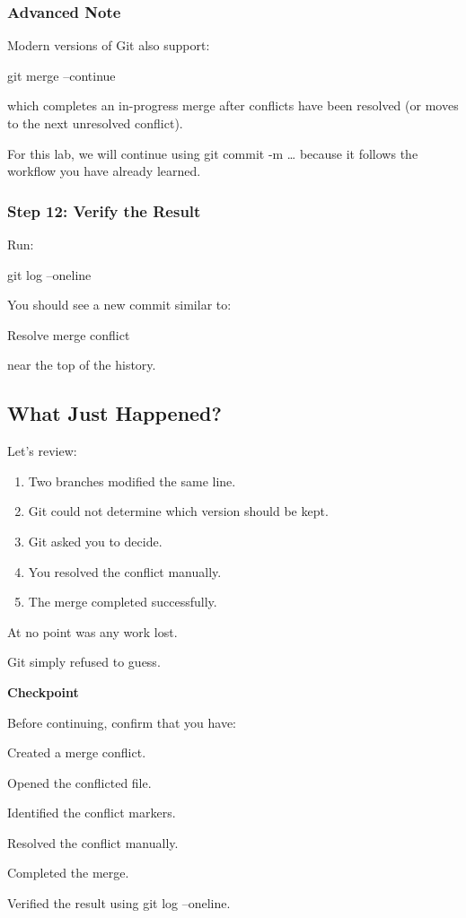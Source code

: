 \documentclass{csc2059practical}
\begin{document}
\subsubsection{Advanced Note}
Modern versions of Git also support:

\begin{terminalplain}
git merge --continue
\end{terminalplain}
which completes an in-progress merge after conflicts have been resolved (or moves to the next unresolved conflict).

For this lab, we will continue using git commit -m \ldots{} because it follows the workflow you have already learned.

\subsubsection{Step 12: Verify the Result}
Run:

\begin{terminalplain}
git log --oneline
\end{terminalplain}
You should see a new commit similar to:

Resolve merge conflict

near the top of the history.

\subsection{What Just Happened?}
Let's review:

\begin{enumerate}
  \item Two branches modified the same line.
  \item Git could not determine which version should be kept.
  \item Git asked you to decide.
  \item You resolved the conflict manually.
  \item The merge completed successfully.
\end{enumerate}
At no point was any work lost.

Git simply refused to guess.

\begin{reflectionbox}
\textbf{Checkpoint}\par
\medskip

Before continuing, confirm that you have:


Created a merge conflict.


Opened the conflicted file.


Identified the conflict markers.


Resolved the conflict manually.


Completed the merge.


Verified the result using git log --oneline.


\end{reflectionbox}
\end{document}

